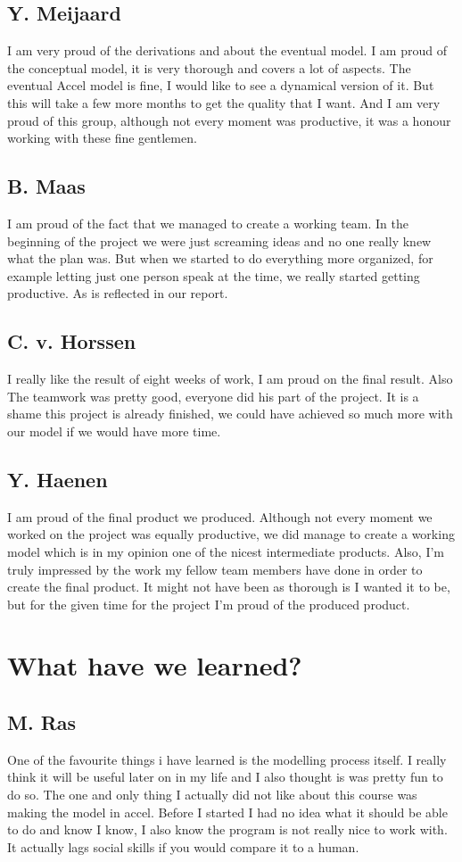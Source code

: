 \documentclass[a4paper, 11pt, notitlepage]{report}
\begin{document}
	\section*{Y. Meijaard} I am very proud of the derivations and about the eventual model. I am proud of the conceptual model, it is very thorough and covers a lot of aspects. The eventual Accel model is fine, I would like to see a dynamical version of it. But this will take a few more months to get the quality that I want. And I am very proud of this group, although not every moment was productive, it was a honour working with these fine gentlemen.
	
	\section*{B. Maas} I am proud of the fact that we managed to create a working team. In the beginning of the project we were just screaming ideas and no one really knew what the plan was. But when we started to do everything more organized, for example letting just one person speak at the time, we really started getting productive. As is reflected in our report.

\section*{C. v. Horssen} I really like the result of eight weeks of work, I am proud on the final result. Also The teamwork was pretty good, everyone did his part of the project. It is a shame this project is already finished, we could have achieved so much more with our model if we would have more time.

\section*{Y. Haenen}
I am proud of the final product we produced. Although not every moment we worked on the project was equally productive, we did manage to create a working model which is in my opinion one of the nicest intermediate products. Also, I'm truly impressed by the work my fellow team members have done in order to create the final product. It might not have been as thorough is I wanted it to be, but for the given time for the project I'm proud of the produced product.
\chapter{What have we learned?}
	\section*{M. Ras}
	One of the favourite things i have learned is the modelling process itself. I really think it will be useful later on in my life and I also thought is was pretty fun to do so. The one and only thing I actually did not like about this course was making the model in accel. Before I started I had no idea what it should be able to do and know I know, I also know the program is not really nice to work with. It actually lags social skills if you would compare it to a human.
	
\end{document}
